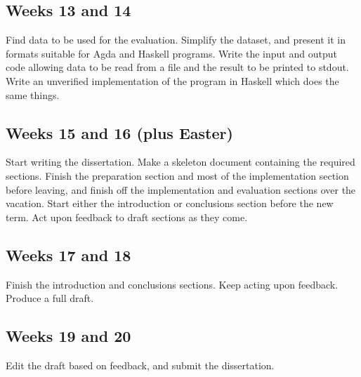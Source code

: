 \subsection*{Weeks 13 and 14} %
Find data to be used for the evaluation.
Simplify the dataset, and present it in formats suitable for Agda and Haskell programs.
Write the input and output code allowing data to be read from a file and the result to be printed to stdout.
Write an unverified implementation of the program in Haskell which does the same things.

\subsection*{Weeks 15 and 16 (plus Easter)} %
Start writing the dissertation.
Make a skeleton document containing the required sections.
Finish the preparation section and most of the implementation section before leaving, and finish off the implementation and evaluation sections over the vacation.
Start either the introduction or conclusions section before the new term.
Act upon feedback to draft sections as they come.

\subsection*{Weeks 17 and 18} %
Finish the introduction and conclusions sections.
Keep acting upon feedback.
Produce a full draft.

\subsection*{Weeks 19 and 20} %
Edit the draft based on feedback, and submit the dissertation.
